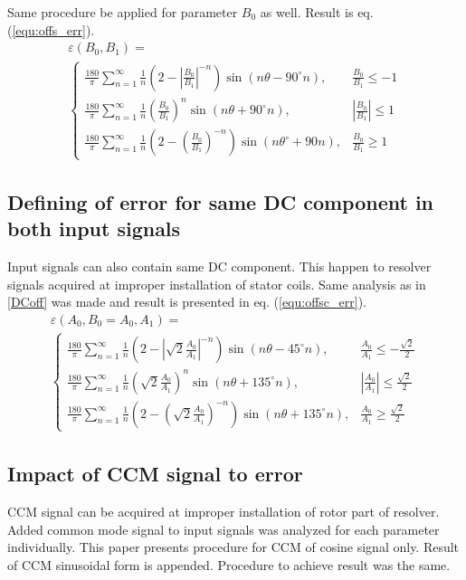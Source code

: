 \documentclass[a4paper]{article}
\begin{document}
Same procedure be applied for parameter $B_0$ as well. Result is eq. (\ref{equ:offs_err}).
\begin{multline}
\label{equ:offs_err}
\varepsilon(B_0, B_1)=\\
\begin{cases}
\frac{180}{\pi}\sum_{n=1}^{\infty}\frac{1}{n}(2-|\frac{B_0}{B_1}|^{-n}) \sin (n \theta -  90^\circ n), & \frac{B_0}{B_1}\leq -1 \\
\frac{180}{\pi}\sum_{n=1}^{\infty}\frac{1}{n}(\frac{B_0}{B_1})^n \sin (n \theta + 90^\circ n), & |\frac{B_0}{B_1}|\leq 1 \\
\frac{180}{\pi}\sum_{n=1}^{\infty}\frac{1}{n}(2-(\frac{B_0}{B_1})^{-n}) \sin (n \theta^\circ + 90 n), & \frac{B_0}{B_1}\geq 1
\end{cases}
\end{multline}

\subsection{Defining of error for same DC component in both input signals}
Input signals can also contain same DC component. This happen to resolver signals acquired at improper installation of stator coils. Same analysis as in \ref{DCoff} was made and result is presented in eq. (\ref{equ:offsc_err}).
\begin{multline}
\label{equ:offsc_err}
\varepsilon(A_0,B_0=A_0, A_1)=\\
\begin{cases}
\frac{180}{\pi}\sum_{n=1}^{\infty}\frac{1}{n}(2-|\sqrt{2}\frac{A_0}{A_1}|^{-n}) \sin (n \theta - 45^\circ n), & \frac{A_0}{A_1}\leq -\frac{\sqrt{2}}{2} \\
\frac{180}{\pi}\sum_{n=1}^{\infty}\frac{1}{n}(\sqrt{2}\frac{A_0}{A_1})^n \sin (n \theta + 135^\circ n), & |\frac{A_0}{A_1}|\leq \frac{\sqrt{2}}{2} \\
\frac{180}{\pi}\sum_{n=1}^{\infty}\frac{1}{n}(2-(\sqrt{2}\frac{A_0}{A_1})^{-n}) \sin (n \theta +135^\circ n), & \frac{A_0}{A_1}\geq \frac{\sqrt{2}}{2}
\end{cases}
\end{multline}

\subsection{Impact of CCM signal to error}
CCM signal can be acquired at improper installation of rotor part of resolver.
Added common mode signal to input signals was analyzed for each parameter individually. This paper presents procedure for CCM of cosine signal only. Result of CCM sinusoidal form is appended. Procedure to achieve result was the same.
\end{document}
